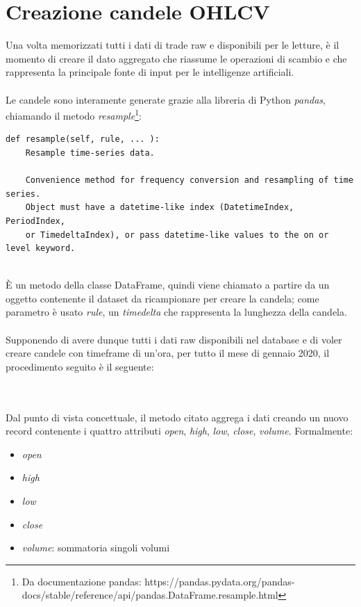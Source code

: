 \documentclass[a4paper,12pt]{report}
\begin{document}
\section{Creazione candele OHLCV}
Una volta memorizzati tutti i dati di trade raw e disponibili per le letture, è il momento di creare il dato aggregato che riassume le operazioni di scambio e che rappresenta la principale fonte di input per le intelligenze artificiali.\\~\\
Le candele sono interamente generate grazie alla libreria di Python \textit{pandas}, chiamando il metodo \textit{resample}\footnote{Da documentazione pandas: https://pandas.pydata.org/pandas-docs/stable/reference/api/pandas.DataFrame.resample.html}:
\begin{verbatim}
def resample(self, rule, ... ):
	Resample time-series data.
	
	Convenience method for frequency conversion and resampling of time series.
	Object must have a datetime-like index (DatetimeIndex, PeriodIndex, 
	or TimedeltaIndex), or pass datetime-like values to the on or level keyword.
	
\end{verbatim}

È un metodo della classe DataFrame, quindi viene chiamato a partire da un oggetto contenente il dataset da ricampionare per creare la candela; come parametro è usato \textit{rule}, un \textit{timedelta} che rappresenta la lunghezza della candela.
\\~\\
Supponendo di avere dunque tutti i dati raw disponibili nel database e di voler creare candele con timeframe di un'ora, per tutto il mese di gennaio 2020, il procedimento seguito è il seguente:


	\\~\\
Dal punto di vista concettuale, il metodo citato aggrega i dati creando un nuovo record contenente i quattro attributi \textit{open}, \textit{high}, \textit{low}, \textit{close}, \textit{volume}. Formalmente:
\begin{itemize}
	\item \textit{open}
	\item \textit{high}
	\item \textit{low}
	\item \textit{close}
	\item \textit{volume}: sommatoria singoli volumi %
\end{itemize}
\end{document}
